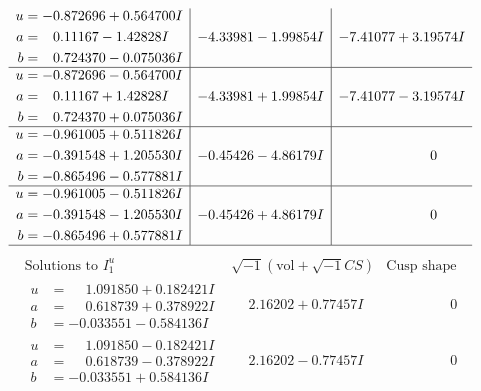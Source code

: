 \documentclass[1p]{elsarticle_modified}
\theoremstyle{definition}
\newcommand{\I}{\sqrt{-1}}
\begin{document}
$$\begin{array}{c|c|c}
\begin{aligned}
u &= -0.872696 + 0.564700 I \\
a &= \phantom{-}0.11167 - 1.42828 I \\
b &= \phantom{-}0.724370 - 0.075036 I\end{aligned}
 & -4.33981 - 1.99854 I & -7.41077 + 3.19574 I \\ \hline\begin{aligned}
u &= -0.872696 - 0.564700 I \\
a &= \phantom{-}0.11167 + 1.42828 I \\
b &= \phantom{-}0.724370 + 0.075036 I\end{aligned}
 & -4.33981 + 1.99854 I & -7.41077 - 3.19574 I \\ \hline\begin{aligned}
u &= -0.961005 + 0.511826 I \\
a &= -0.391548 + 1.205530 I \\
b &= -0.865496 - 0.577881 I\end{aligned}
 & -0.45426 - 4.86179 I & \phantom{-0.000000 } 0 \\ \hline\begin{aligned}
u &= -0.961005 - 0.511826 I \\
a &= -0.391548 - 1.205530 I \\
b &= -0.865496 + 0.577881 I\end{aligned}
 & -0.45426 + 4.86179 I & \phantom{-0.000000 } 0\\
 \hline 
 \end{array}$$\newpage$$\begin{array}{c|c|c}  
\text{Solutions to }I^u_{1}& \I (\text{vol} + \sqrt{-1}CS) & \text{Cusp shape}\\
 \hline 
\begin{aligned}
u &= \phantom{-}1.091850 + 0.182421 I \\
a &= \phantom{-}0.618739 + 0.378922 I \\
b &= -0.033551 - 0.584136 I\end{aligned}
 & \phantom{-}2.16202 + 0.77457 I & \phantom{-0.000000 } 0 \\ \hline\begin{aligned}
u &= \phantom{-}1.091850 - 0.182421 I \\
a &= \phantom{-}0.618739 - 0.378922 I \\
b &= -0.033551 + 0.584136 I\end{aligned}
 & \phantom{-}2.16202 - 0.77457 I & \phantom{-0.000000 } 0 \\ \hline\begin{aligned}

\end{aligned}
\end{array}$$
\end{document}
